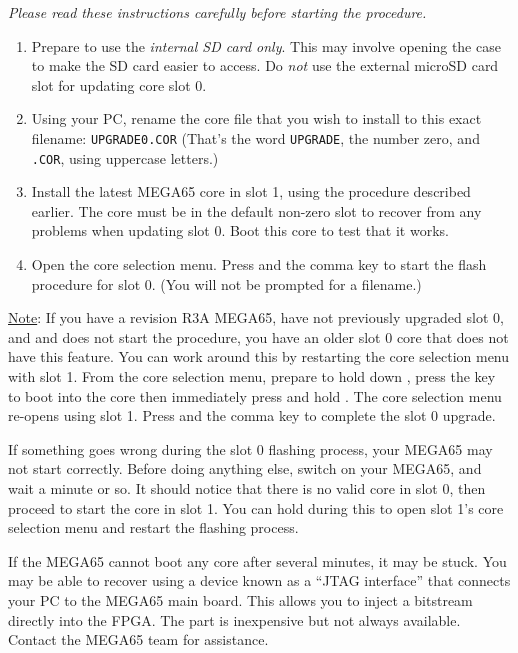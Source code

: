 {\em Please read these instructions carefully before starting the procedure.}

\begin{enumerate}
  \item Prepare to use the {\em internal SD card only}. This may involve opening the case to make the SD card easier to access. Do {\em not} use the external microSD card slot for updating core slot 0.
  \item Using your PC, rename the core file that you wish to install to this exact filename: {\tt UPGRADE0.COR} (That's the word {\tt UPGRADE}, the number zero, and {\tt .COR}, using uppercase letters.)
  \item Install the latest MEGA65 core in slot 1, using the procedure described earlier. The core must be in the default non-zero slot to recover from any problems when updating slot 0. Boot this core to test that it works.
  \item Open the core selection menu. Press \megasymbolkey and the comma key to start the flash procedure for slot 0. (You will not be prompted for a filename.)
\end{enumerate}

\ifdefined\printmanual
\else
\underline{Note}: If you have a revision R3A MEGA65, have not previously upgraded slot 0, and \megasymbolkey and \megakey{,} does not start the procedure, you have an older slot 0 core that does not have this feature. You can work around this by restarting the core selection menu with slot 1. From the core selection menu, prepare to hold down , press the  key to boot into the core then immediately press and hold . The core selection menu re-opens using slot 1. Press \megasymbolkey and the comma key to complete the slot 0 upgrade.
\fi

If something goes wrong during the slot 0 flashing process, your MEGA65 may not start correctly. Before doing anything else, switch on your MEGA65, and wait a minute or so. It should notice that there is no valid core in slot 0, then proceed to start the core in slot 1. You can hold  during this to open slot 1's core selection menu and restart the flashing process.

If the MEGA65 cannot boot any core after several minutes, it may be stuck. You may be able to recover using a device known as a ``JTAG interface'' that connects your PC to the MEGA65 main board. This allows you to inject a bitstream directly into the FPGA. The part is inexpensive but not always available. Contact the MEGA65 team for assistance.


